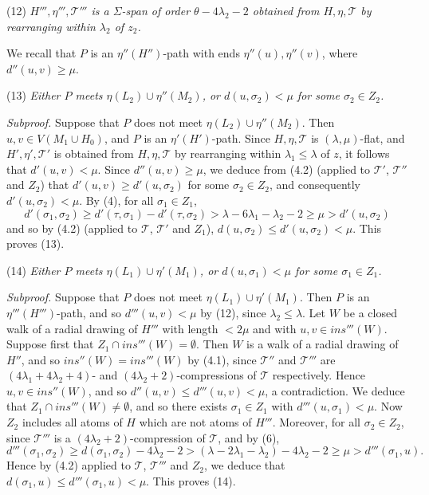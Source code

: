 \hspace*{12pt}(12) \textit{$H''', \eta''', \mathcal{T}'''$ is a $\Sigma$-span of order $\theta - 4\lambda_2 - 2$ obtained from $H, \eta, \mathcal{T}$ by rearranging within $\lambda_2$ of $z_2$.}

We recall that $P$ is an $\eta''(H'')$-path with ends $\eta''(u), \eta''(v)$, where $d''(u, v) \ge \mu$.

\hspace*{12pt}(13) \textit{Either $P$ meets $\eta(L_2) \cup \eta''(M_2)$, or $d(u, \sigma_2) < \mu$ for some $\sigma_2 \in Z_2$.}

\textit{Subproof.} Suppose that $P$ does not meet $\eta(L_2) \cup \eta''(M_2)$. Then $u, v \in V(M_1 \cup H_0)$, and $P$ is an $\eta'(H')$-path. Since $H, \eta, \mathcal{T}$ is $(\lambda, \mu)$-flat, and $H', \eta', \mathcal{T}'$ is obtained from $H, \eta, \mathcal{T}$ by rearranging within $\lambda_1 \le \lambda$ of $z$, it follows that $d'(u, v) < \mu$. Since $d''(u, v) \ge \mu$, we deduce from (4.2) (applied to $\mathcal{T}'$, $\mathcal{T}''$ and $Z_2$) that $d'(u, v) \ge d'(u, \sigma_2)$ for some $\sigma_2 \in Z_2$, and consequently $d'(u, \sigma_2) < \mu$. By (4), for all $\sigma_1 \in Z_1$,
\begin{equation*}
d'(\sigma_1, \sigma_2) \ge d'(\tau, \sigma_1) - d'(\tau, \sigma_2) > \lambda - 6\lambda_1 - \lambda_2 - 2 \ge \mu > d'(u, \sigma_2)
\end{equation*}
and so by (4.2) (applied to $\mathcal{T}$, $\mathcal{T}'$ and $Z_1$), $d(u, \sigma_2) \le d'(u, \sigma_2) < \mu$. This proves (13).

\hspace*{12pt}(14) \textit{Either $P$ meets $\eta(L_1) \cup \eta'(M_1)$, or $d(u, \sigma_1) < \mu$ for some $\sigma_1 \in Z_1$.}

\textit{Subproof.} Suppose that $P$ does not meet $\eta(L_1) \cup \eta'(M_1)$. Then $P$ is an $\eta'''(H''')$-path, and so $d'''(u, v) < \mu$ by (12), since $\lambda_2 \le \lambda$. Let $W$ be a closed walk of a radial drawing of $H'''$ with length $< 2\mu$ and with $u, v \in ins'''(W)$. Suppose first that $Z_1 \cap ins'''(W) = \emptyset$. Then $W$ is a walk of a radial drawing of $H''$, and so $ins''(W) = ins'''(W)$ by (4.1), since $\mathcal{T}''$ and $\mathcal{T}'''$ are $(4\lambda_1 + 4\lambda_2 + 4)$- and $(4\lambda_2 + 2)$-compressions of $\mathcal{T}$ respectively. Hence $u, v \in ins''(W)$, and so $d''(u, v) \le d'''(u, v) < \mu$, a contradiction. We deduce that $Z_1 \cap ins'''(W) \ne \emptyset$, and so there exists $\sigma_1 \in Z_1$ with $d'''(u, \sigma_1) < \mu$. Now $Z_2$ includes all atoms of $H$ which are not atoms of $H'''$. Moreover, for all $\sigma_2 \in Z_2$, since $\mathcal{T}'''$ is a $(4\lambda_2 + 2)$-compression of $\mathcal{T}$, and by (6),
\begin{equation*}
d'''(\sigma_1, \sigma_2) \ge d(\sigma_1, \sigma_2) - 4\lambda_2 - 2 > (\lambda - 2\lambda_1 - \lambda_2) - 4\lambda_2 - 2 \ge \mu > d'''(\sigma_1, u).
\end{equation*}
Hence by (4.2) applied to $\mathcal{T}$, $\mathcal{T}'''$ and $Z_2$, we deduce that $d(\sigma_1, u) \le d'''(\sigma_1, u) < \mu$. This proves (14).

